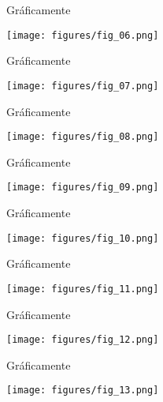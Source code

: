 \begin{frame}{Gráficamente}
	\begin{center}
		\texttt{[image: figures/fig\_06.png]}
	\end{center}
\end{frame}
\begin{frame}{Gráficamente}
	\begin{center}
		\texttt{[image: figures/fig\_07.png]}
	\end{center}
\end{frame}
\begin{frame}{Gráficamente}
	\begin{center}
		\texttt{[image: figures/fig\_08.png]}
	\end{center}
\end{frame}
\begin{frame}{Gráficamente}
	\begin{center}
		\texttt{[image: figures/fig\_09.png]}
	\end{center}
\end{frame}
\begin{frame}{Gráficamente}
	\begin{center}
		\texttt{[image: figures/fig\_10.png]}
	\end{center}
\end{frame}
\begin{frame}{Gráficamente}
	\begin{center}
		\texttt{[image: figures/fig\_11.png]}
	\end{center}
\end{frame}
\begin{frame}{Gráficamente}
	\begin{center}
		\texttt{[image: figures/fig\_12.png]}
	\end{center}
\end{frame}
\begin{frame}{Gráficamente}
	\begin{center}
		\texttt{[image: figures/fig\_13.png]}
	\end{center}
\end{frame}
